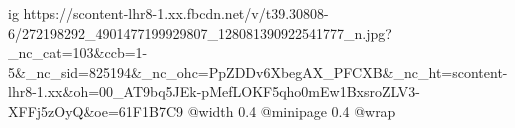  
 
 
 
 

\ifcmt
  ig https://scontent-lhr8-1.xx.fbcdn.net/v/t39.30808-6/272198292_4901477199929807_128081390922541777_n.jpg?_nc_cat=103&ccb=1-5&_nc_sid=825194&_nc_ohc=PpZDDv6XbegAX_PFCXB&_nc_ht=scontent-lhr8-1.xx&oh=00_AT9bq5JEk-pMefLOKF5qho0mEw1BxsroZLV3-XFFj5zOyQ&oe=61F1B7C9
  @width 0.4
  @minipage 0.4
  @wrap \parpic[r]
\fi
